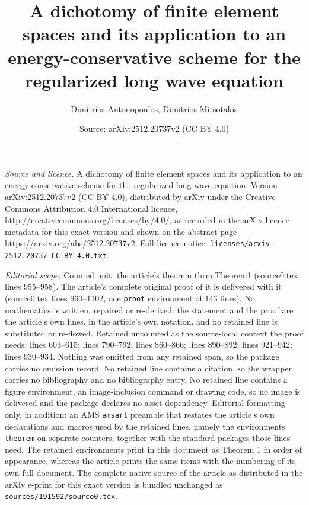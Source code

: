 \documentclass[10pt,a4paper]{amsart}
\title{A dichotomy of finite element spaces and its application to an energy-conservative scheme for the regularized long wave equation}
\author{Dimitrios Antonopoulos, Dimitrios Mitsotakis}
\date{Source: arXiv:2512.20737v2 (CC BY 4.0)}
\begin{document}
\maketitle

\noindent\emph{Source and licence.} A dichotomy of finite element spaces and its application to an energy-conservative scheme for the regularized long wave equation. Version arXiv:2512.20737v2 (CC BY 4.0), distributed by arXiv under the Creative Commons Attribution 4.0 International licence, http://creativecommons.org/licenses/by/4.0/, as recorded in the arXiv licence metadata for this exact version and shown on the abstract page https://arxiv.org/abs/2512.20737v2. Full licence notice: \texttt{licenses/arxiv-2512.20737-CC-BY-4.0.txt}.\par\smallskip

\noindent\textit{Editorial scope.} Counted unit: the article's theorem thrm:Theorem1 (source0.tex lines 955--958). The article's complete original proof of it is delivered with it (source0.tex lines 960--1102, one \texttt{proof} environment of 143 lines). No mathematics is written, repaired or re-derived: the statement and the proof are the article's own lines, in the article's own notation, and no retained line is substituted or re-flowed.  Retained uncounted as the source-local context the proof needs: lines 603--615; lines 790--792; lines 860--866; lines 890--892; lines 921--942; lines 930--934.  Nothing was omitted from any retained span, so the package carries no omission record.  No retained line contains a citation, so the wrapper carries no bibliography and no bibliography entry.  No retained line contains a figure environment, an image-inclusion command or drawing code, so no image is delivered and the package declares no asset dependency.  Editorial formatting only, in addition: an AMS \texttt{amsart} preamble that restates the article's own declarations and macros used by the retained lines, namely the environments \texttt{theorem} on separate counters, together with the standard packages those lines need.  The retained environments print in this document as Theorem 1 in order of appearance, whereas the article prints the same items with the numbering of its own full document.  The complete native source of the article as distributed in the arXiv e-print for this exact version is bundled unchanged as \texttt{sources/191592/source0.tex}.
\end{document}
